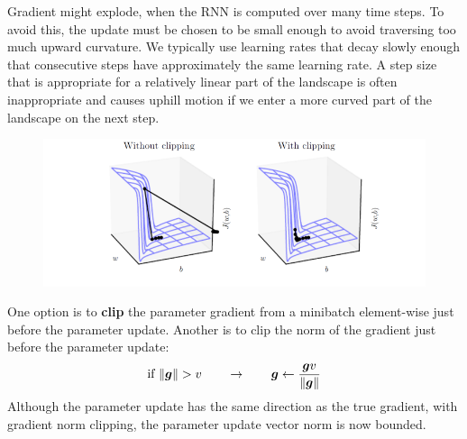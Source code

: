 \begin{multicols}{2}
	Gradient might explode, when the RNN is computed over many time steps.
	To avoid this, the update must be chosen to be small enough to avoid traversing too much upward curvature.
	We typically use learning rates that decay slowly enough that consecutive steps have approximately the same learning rate.
	A step size that is appropriate for a relatively linear part of the landscape is often inappropriate and causes uphill motion if we enter a more curved part of the landscape on the next step.
	\begin{figure}[H]
		\centering
		\includegraphics[width=0.9\linewidth]{images/clipping.png}
	\end{figure}
	One option is to \textbf{clip} the parameter gradient from a minibatch element-wise just before the parameter update.
	Another is to clip the norm of the gradient just before the parameter update:
	\[ \text{if } \lVert{\bm{g}}\rVert > v \qquad\rightarrow\qquad {\bm{g}} \leftarrow\frac{{\bm{g}} v}{\lVert{\bm{g}}\rVert} \]
	Although the parameter update has the same direction as the true gradient, with gradient norm clipping, the parameter update vector norm is now bounded.
	

\end{multicols}
